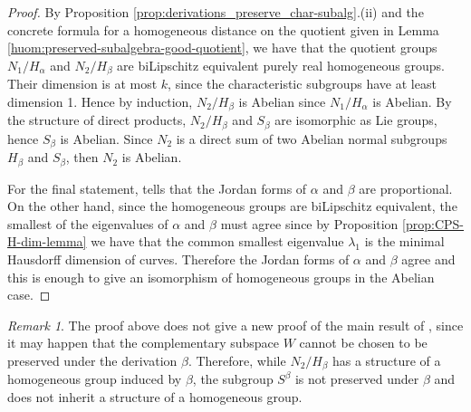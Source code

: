 \documentclass[a4paper,12pt]{amsart}
\theoremstyle{plain}
\theoremstyle{definition}
\theoremstyle{plain}
\theoremstyle{remark}
\newtheorem{huom}[maar]{Remark}
\begin{document}
\begin{proof}
	
	By Proposition \ref{prop:derivations_preserve_char-subalg}.(ii) and the concrete formula for a homogeneous distance on the quotient given in Lemma \ref{huom:preserved-subalgebra-good-quotient}, we have that the quotient groups 
	\( N_1/H_\alpha \) and \( N_2/H_\beta \) are biLipschitz equivalent purely real homogeneous groups. Their dimension is at most \( k \), since the characteristic subgroups have at least dimension 1. 
	Hence by induction, \( N_2/H_\beta \) is Abelian since \( N_1/H_\alpha \) is Abelian. 
	By the structure of direct products, \( N_2/H_\beta \) and \( S_\beta \) are isomorphic as Lie groups, hence \( S_\beta \) is Abelian.
	Since \( N_2 \) is a direct sum of two Abelian normal subgroups \( H_\beta \) and \( S_\beta \), then \( N_2 \) is Abelian.
	
	For the final statement, \cite[Theorem 1.1]{MR3180486} tells that the Jordan forms of \( \alpha \) and \( \beta\) are proportional. On the other hand, since the homogeneous groups are biLipschitz equivalent, the smallest of the eigenvalues of \( \alpha \) and \( \beta \) must agree since by Proposition \ref{prop:CPS-H-dim-lemma} we have that the common smallest eigenvalue \( \lambda_1 \) is the minimal Hausdorff dimension of curves. Therefore the Jordan forms of \( \alpha \) and \( \beta \) agree and this is enough to give an isomorphism of homogeneous groups in the Abelian case.
\end{proof}


\begin{huom}
	The proof above does not give a new proof of the main result of \cite{MR3180486}, since it may happen that the complementary subspace \( W \) cannot be chosen to be preserved under the derivation \( \beta \). Therefore, while \( N_2 / H_\beta \) has a structure of a homogeneous group induced by \(\beta \), the subgroup \( S^\beta \) is not preserved under \( \beta\) and does not inherit a structure of a homogeneous group.
\end{huom}
\end{document}
